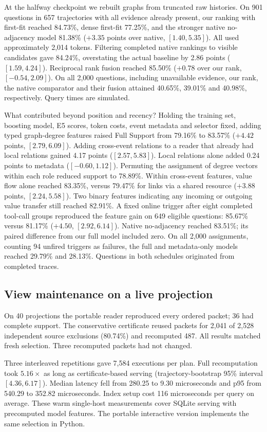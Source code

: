 \documentclass[conference]{IEEEtran}
\begin{document}
At the halfway checkpoint we rebuilt graphs from truncated raw histories. On 901 questions in 657 trajectories with all evidence already present, our ranking with first-fit reached 84.73\%, dense first-fit 77.25\%, and the stronger native no-adjacency model 81.38\% ($+3.35$ points over native, $[1.40,5.35]$). All used approximately 2,014 tokens. Filtering completed native rankings to visible candidates gave 84.24\%, overstating the actual baseline by 2.86 points ($[1.59,4.24]$). Reciprocal rank fusion reached 85.50\% ($+0.78$ over our rank, $[-0.54,2.09]$). On all 2,000 questions, including unavailable evidence, our rank, the native comparator and their fusion attained 40.65\%, 39.01\% and 40.98\%, respectively. Query times are simulated.

What contributed beyond position and recency? Holding the training set, boosting model, E5 scores, token costs, event metadata and selector fixed, adding typed graph-degree features raised Full Support from 79.16\% to 83.57\% ($+4.42$ points, $[2.79,6.09]$). Adding cross-event relations to a reader that already had local relations gained 4.17 points ($[2.57,5.83]$). Local relations alone added 0.24 points to metadata ($[-0.60,1.12]$). Permuting the assignment of degree vectors within each role reduced support to 78.89\%. Within cross-event features, value flow alone reached 83.35\%, versus 79.47\% for links via a shared resource ($+3.88$ points, $[2.24,5.58]$). Two binary features indicating any incoming or outgoing value transfer still reached 82.91\%. A fixed online trigger after eight completed tool-call groups reproduced the feature gain on 649 eligible questions: 85.67\% versus 81.17\% ($+4.50$, $[2.92,6.14]$). Native no-adjacency reached 83.51\%; its paired difference from our full model included zero. On all 2,000 assignments, counting 94 unfired triggers as failures, the full and metadata-only models reached 29.79\% and 28.13\%. Questions in both schedules originated from completed traces.


\subsection{View maintenance on a live projection}
On 40 projections the portable reader reproduced every ordered packet; 36 had complete support. The conservative certificate reused packets for 2,041 of 2,528 independent source exclusions (80.74\%) and recomputed 487. All results matched fresh selection. Three recomputed packets had not changed.

Three interleaved repetitions gave 7,584 executions per plan. Full recomputation took $5.16\times$ as long as certificate-based serving (trajectory-bootstrap 95\% interval $[4.36,6.17]$). Median latency fell from 280.25 to 9.30 microseconds and p95 from 540.29 to 352.82 microseconds. Index setup cost 116 microseconds per query on average. These warm single-host measurements cover SQLite serving with precomputed model features. The portable interactive version implements the same selection in Python.
\end{document}

